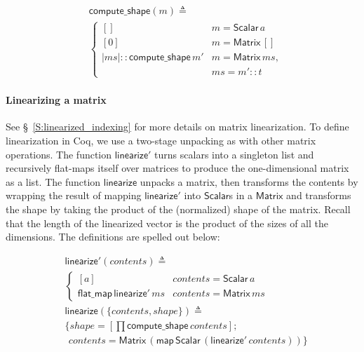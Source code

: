 \documentclass[11pt,conference]{IEEEtran}
\newcommand{\var}[1]{\mathit{#1}}
\newcommand{\func}[1]{\mathsf{#1}}
\theoremstyle{plain} %
\theoremstyle{definition}
\theoremstyle{remark}
\begin{document}
\begin{align*}
    & \func{compute\_shape}(\var{m}) \triangleq \\
    & \begin{cases}
        [] & m = \func{Scalar}\, a \\
        [0] & m = \func{Matrix}\, [] \\
        |\var{ms}| :: \func{compute\_shape}\, m' & m = \func{Matrix}\, \var{ms}, \\
        & \var{ms} = m'::t
    \end{cases}
\end{align*}

\paragraph{Linearizing a matrix}\label{S:linearize_coq} See
\S~\ref{S:linearized_indexing} for more details on matrix linearization. To
define linearization in Coq, we use a two-stage unpacking as with other matrix
operations. The function \(\func{linearize'}\) turns scalars into a singleton
list and recursively flat-maps itself over matrices to produce the
one-dimensional matrix as a list. The function \(\func{linearize}\) unpacks a
matrix, then transforms the contents by wrapping the result of mapping
\(\func{linearize'}\) into \(\func{Scalar}\)s in a \(\func{Matrix}\) and
transforms the shape by taking the product of the (normalized) shape of the
matrix. Recall that the length of the linearized vector is the product of the
sizes of all the dimensions. The definitions are spelled out below:

\begin{align*}
    & \func{linearize'}(\var{contents}) \triangleq \\
    & \begin{cases}
        [\var{a}] & \var{contents} = \func{Scalar}\, \var{a} \\
        \func{flat\_map}\, \func{linearize'}\, \var{ms} & \var{contents} =
        \func{Matrix}\, ms
    \end{cases} \\
    & \func{linearize}(\{\var{contents}, \var{shape}\}) \triangleq \\
    & \{ \var{shape} = \left[\prod \func{compute\_shape}\, \var{contents}\right]; \\
    & \ \, \var{contents} = \func{Matrix}\, (\func{map}\, \func{Scalar}\, (\func{linearize'}\, \var{contents})) \}
\end{align*}
\end{document}
